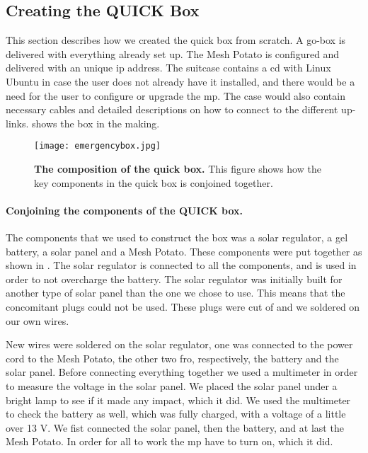 \subsection{Creating the QUICK Box}
This section describes how we created the \gls{quick} box from scratch. A go-box is delivered with everything already set up. The Mesh Potato is configured and delivered with an unique \gls{ip} address. The suitcase contains a cd with Linux Ubuntu in case the user does not already have it installed, and there would be a need for the user to configure or upgrade the \gls{mp}. The case would also contain necessary cables and detailed descriptions on how to connect to the different up-links.  shows the box in the making.

\begin{figure}[t]
  \centering
      \texttt{[image: emergencybox.jpg]}
  \caption [The composition of the \gls{quick} box]{\textbf{The composition of the \gls{quick} box.} This figure shows how the key components in the \gls{quick} box is conjoined together.}
  \label{fig:emergencybox}
\end{figure}

\paragraph{Conjoining the components of the QUICK box.}
The components that we used to construct the box was a solar regulator, a gel battery, a solar panel and a Mesh Potato. These components were put together as shown in . The solar regulator is connected to all the components, and is used in order to not overcharge the battery. The solar regulator was initially built for another type of solar panel than the one we chose to use. This means that the concomitant plugs could not be used. These plugs were cut of and we soldered on our own wires.  

New wires were soldered on the solar regulator, one was connected to the power cord to the Mesh Potato, the other two fro, respectively, the battery and the solar panel. Before connecting everything together we used a multimeter in order to measure the voltage in the solar panel. We placed the solar panel under a bright lamp to see if it made any impact, which it did. We used the multimeter to check the battery as well, which was fully charged, with a voltage of a little over 13 V. 
We fist connected the solar panel, then the battery, and at last the Mesh Potato. In order for all to work the \gls{mp} have to turn on, which it did.  

